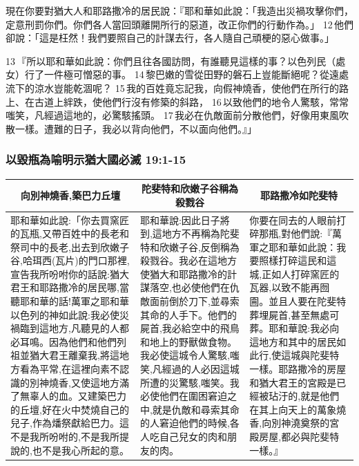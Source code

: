 現在你要對猶大人和耶路撒冷的居民說：『耶和華如此說：「我造出災禍攻擊你們，定意刑罰你們。你們各人當回頭離開所行的惡道，改正你們的行動作為。」 12 他們卻說：「這是枉然！我們要照自己的計謀去行，各人隨自己頑梗的惡心做事。」

13 『所以耶和華如此說：你們且往各國訪問，有誰聽見這樣的事？以色列民（處女）行了一件極可憎惡的事。 14 黎巴嫩的雪從田野的磐石上豈能斷絕呢？從遠處流下的涼水豈能乾涸呢？ 15 我的百姓竟忘記我，向假神燒香，使他們在所行的路上、在古道上絆跌，使他們行沒有修築的斜路， 16 以致他們的地令人驚駭，常常嗤笑，凡經過這地的，必驚駭搖頭。 17 我必在仇敵面前分散他們，好像用東風吹散一樣。遭難的日子，我必以背向他們，不以面向他們。』」




\subsubsection{以毀瓶為喻明示猶大國必滅 19:1-15}
\begin{table}[H]
\centering
\begin{tabular}{p{6.75cm}|p{5.35cm}|p{5.15cm}}\hline\hline
\multicolumn{1}{c|}{向別神燒香,築巴力丘壇}&\multicolumn{1}{c|}{陀斐特和欣嫩子谷稱為殺戮谷}&\multicolumn{1}{c}{耶路撒冷如陀斐特}\\\hline
耶和華如此說:「你去買窯匠的瓦瓶,又帶百姓中的長老和祭司中的長老,出去到欣嫩子谷,哈珥西(瓦片)的門口那裡,宣告我所吩咐你的話說:猶大君王和耶路撒冷的居民哪,當聽耶和華的話!萬軍之耶和華以色列的神如此說:我必使災禍臨到這地方,凡聽見的人都必耳鳴。因為他們和他們列祖並猶大君王離棄我,將這地方看為平常,在這裡向素不認識的別神燒香,又使這地方滿了無辜人的血。又建築巴力的丘壇,好在火中焚燒自己的兒子,作為燔祭獻給巴力。這不是我所吩咐的,不是我所提說的,也不是我心所起的意。 
&耶和華說:因此日子將到,這地方不再稱為陀斐特和欣嫩子谷,反倒稱為殺戮谷。我必在這地方使猶大和耶路撒冷的計謀落空,也必使他們在仇敵面前倒於刀下,並尋索其命的人手下。他們的屍首,我必給空中的飛鳥和地上的野獸做食物。我必使這城令人驚駭,嗤笑,凡經過的人必因這城所遭的災驚駭,嗤笑。我必使他們在圍困窘迫之中,就是仇敵和尋索其命的人窘迫他們的時候,各人吃自己兒女的肉和朋友的肉。
&你要在同去的人眼前打碎那瓶,對他們說:『萬軍之耶和華如此說：我要照樣打碎這民和這城,正如人打碎窯匠的瓦器,以致不能再囫圇。並且人要在陀斐特葬埋屍首,甚至無處可葬。耶和華說:我必向這地方和其中的居民如此行,使這城與陀斐特一樣。耶路撒冷的房屋和猶大君王的宮殿是已經被玷汙的,就是他們在其上向天上的萬象燒香,向別神澆奠祭的宮殿房屋,都必與陀斐特一樣。』
\\\hline
\end{tabular}
\end{table}








